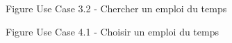 \documentclass[a4paper, 11pt]{article}
\begin{document}
	\begin{figure}[h]
        \caption{Figure Use Case 3.2 - Chercher un emploi du temps}
        \label{fig-diag-use-case-3-2}
        \end{figure}
	\clearpage
	\begin{figure}[h]
        \caption{Figure Use Case 4.1 - Choisir un emploi du temps}
        \label{fig-diag-use-case-4-1}
        \end{figure}
\end{document}
